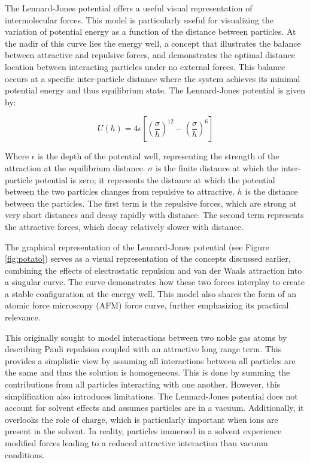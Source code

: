 The Lennard-Jones potential offers a useful visual representation of intermolecular forces. This model is particularly useful for visualizing the variation of potential energy as a function of the distance between particles. At the nadir of this curve lies the energy well, a concept that illustrates the balance between attractive and repulsive forces, and demonstrates the optimal distance location between interacting particles under no external forces. This balance occurs at a specific inter-particle distance where the system achieves its minimal potential energy and thus equilibrium state. The Lennard-Jones potential is given by:

\begin{equation}
U(h) = 4 \epsilon \left[ \left( \frac{\sigma}{h} \right)^{12} - \left( \frac{\sigma}{h} \right)^6 \right]
\end{equation}

Where $\epsilon$ is the depth of the potential well, representing the strength of the attraction at the equilibrium distance. $\sigma$ is the finite distance at which the inter-particle potential is zero; it represents the distance at which the potential between the two particles changes from repulsive to attractive. $h$ is the distance between the particles. The first term is the repulsive forces, which are strong at very short distances and decay rapidly with distance. The second term represents the attractive forces, which decay relatively slower with distance.

The graphical representation of the Lennard-Jones potential (see Figure \ref{fig:potato}) serves as a visual representation of the concepts discussed earlier, combining the effects of electrostatic repulsion and van der Waals attraction into a singular curve. The curve demonstrates how these two forces interplay to create a stable configuration at the energy well. This model also shares the form of an atomic force microscopy (AFM) force curve, further emphasizing its practical relevance. 


This originally sought to model interactions between two noble gas atoms by describing Pauli repulsion coupled with an attractive long range term. This provides a simplistic view by assuming all interactions between all particles are the same and thus the solution is homogeneous. This is done by summing the contributions from all particles interacting with one another. However, this simplification also introduces limitations. The Lennard-Jones potential does not account for solvent effects and assumes particles are in a vacuum. Additionally, it overlooks the role of charge, which is particularly important when ions are present in the solvent. In reality, particles immersed in a solvent experience modified forces leading to a reduced attractive interaction than vacuum conditions.
\cite{lilBlueBook}



